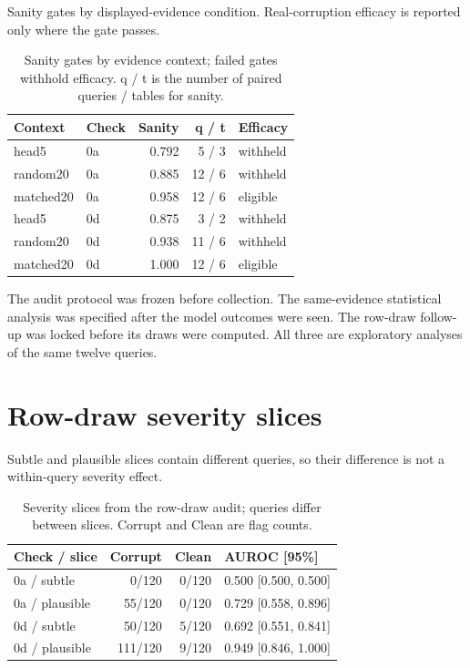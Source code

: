 \documentclass[letterpaper]{article}
\begin{document}
Sanity gates by displayed-evidence condition. Real-corruption efficacy is reported only where the gate passes.


\begin{table}[tbp]
\centering
{\small
\setlength{\tabcolsep}{3pt}
\begin{tabular}{llrrl}
\toprule
Context & Check & Sanity & q / t & Efficacy \\ \midrule
head5 & 0a & 0.792 & 5 / 3 & withheld \\
random20 & 0a & 0.885 & 12 / 6 & withheld \\
matched20 & 0a & 0.958 & 12 / 6 & eligible \\
head5 & 0d & 0.875 & 3 / 2 & withheld \\
random20 & 0d & 0.938 & 11 / 6 & withheld \\
matched20 & 0d & 1.000 & 12 / 6 & eligible \\
\bottomrule
\end{tabular}
}

\caption{Sanity gates by evidence context; failed gates withhold efficacy. q / t is the number of paired queries / tables for sanity.}
\label{tab:gates}
\end{table}

The audit protocol was frozen before collection. The same-evidence statistical analysis was specified after the model outcomes were seen. The row-draw follow-up was locked before its draws were computed. All three are exploratory analyses of the same twelve queries.


\section{Row-draw severity slices}

Subtle and plausible slices contain different queries, so their difference is not a within-query severity effect.


\begin{table}[tbp]
\centering
{\small
\setlength{\tabcolsep}{3pt}
\begin{tabular}{lrrl}
\toprule
Check / slice & Corrupt & Clean & AUROC [95\%] \\ \midrule
0a / subtle & 0/120 & 0/120 & 0.500 [0.500, 0.500] \\
0a / plausible & 55/120 & 0/120 & 0.729 [0.558, 0.896] \\
0d / subtle & 50/120 & 5/120 & 0.692 [0.551, 0.841] \\
0d / plausible & 111/120 & 9/120 & 0.949 [0.846, 1.000] \\
\bottomrule
\end{tabular}
}

\caption{Severity slices from the row-draw audit; queries differ between slices. Corrupt and Clean are flag counts.}
\label{tab:severity}
\end{table}
\end{document}
